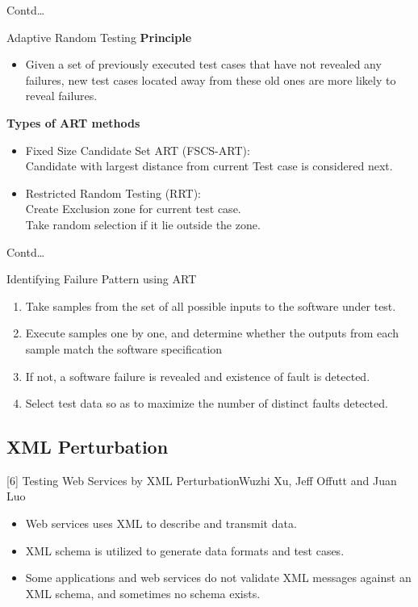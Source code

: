 \documentclass[10pt]{beamer}
\begin{document}
\begin{frame}{Contd\dots}
	\begin{block}{Adaptive Random Testing}
		\textbf{Principle}
		\begin{itemize}
			
			\item Given a set of previously executed test cases
			that have not revealed any failures, new test cases
			located away from these old ones are more likely to
			reveal failures.
		\end{itemize}
		\textbf{Types of ART methods}
		\begin{itemize}
			\item Fixed Size Candidate Set ART (FSCS-ART):\\
			Candidate with largest distance from current Test case is considered next.
			\item Restricted Random Testing (RRT):\\
			Create Exclusion zone for current test case.\\
			Take random selection if it lie outside the zone.
		\end{itemize}
		
	\end{block}
\end{frame}

\begin{frame}{Contd\dots}
\begin{block}{Identifying Failure Pattern using ART}
\begin{enumerate}
\item Take samples from the set of all possible inputs to the software under test.
\item Execute samples one by one, and determine whether the outputs from each sample match the software specification
\item If not, a software failure is revealed and existence of fault is detected.
\item Select test data so as to maximize the number of distinct faults detected.
\end{enumerate}
\end{block}
\end{frame}



\subsection{XML Perturbation}
\begin{frame}{[6] Testing Web Services by XML Perturbation}{Wuzhi Xu, Jeff Offutt and Juan Luo}
	\begin{itemize}
		
\item Web services uses XML to describe and transmit data.
\item XML schema is utilized to generate data formats and test cases.
\item Some applications and web services do not validate XML messages against an XML schema, and sometimes no schema exists.
		
	\end{itemize}

\end{frame}
\end{document}
